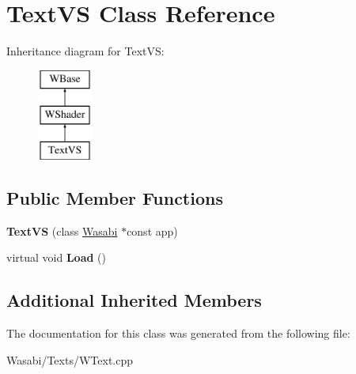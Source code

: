 \hypertarget{class_text_v_s}{}\section{Text\+VS Class Reference}
\label{class_text_v_s}
Inheritance diagram for Text\+VS\+:\begin{figure}[H]
\begin{center}
\leavevmode
\includegraphics[height=3.000000cm]{class_text_v_s}
\end{center}
\end{figure}
\subsection*{Public Member Functions}
\begin{DoxyCompactItemize}
\item 
{\bfseries Text\+VS} (class \hyperlink{class_wasabi}{Wasabi} $\ast$const app)\hypertarget{class_text_v_s_a224ceb3b8ad79e2116702fa53ee18e7f}{}\label{class_text_v_s_a224ceb3b8ad79e2116702fa53ee18e7f}

\item 
virtual void {\bfseries Load} ()\hypertarget{class_text_v_s_a5f5b2c085db4b90bc68f4c69434285ee}{}\label{class_text_v_s_a5f5b2c085db4b90bc68f4c69434285ee}

\end{DoxyCompactItemize}
\subsection*{Additional Inherited Members}


The documentation for this class was generated from the following file\+:\begin{DoxyCompactItemize}
\item 
Wasabi/\+Texts/W\+Text.\+cpp\end{DoxyCompactItemize}
